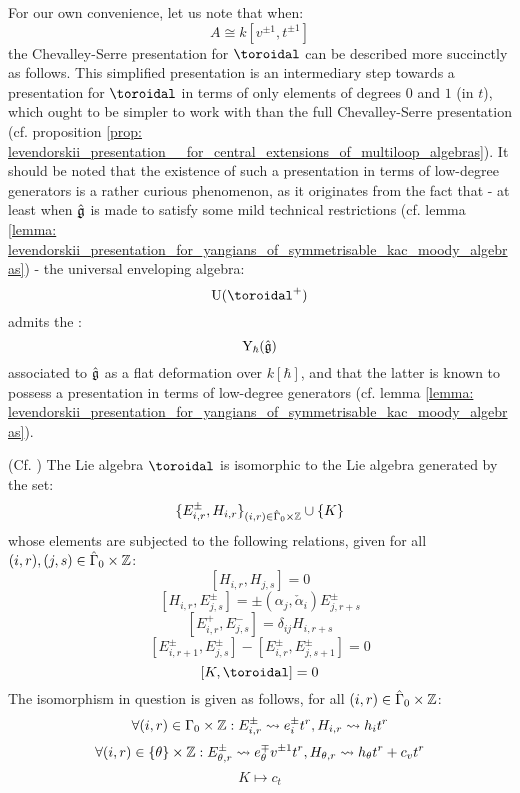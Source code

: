         For our own convenience, let us note that when:
            $$A \cong k[v^{\pm 1}, t^{\pm 1}]$$
        the Chevalley-Serre presentation for $\toroidal$ can be described more succinctly as follows. This simplified presentation is an intermediary step towards a presentation for $\toroidal$ in terms of only elements of degrees $0$ and $1$ (in $t$), which ought to be simpler to work with than the full Chevalley-Serre presentation (cf. proposition \ref{prop: levendorskii_presentation__for_central_extensions_of_multiloop_algebras}). It should be noted that the existence of such a presentation in terms of low-degree generators is a rather curious phenomenon, as it originates from the fact that - at least when $\hat{\mathfrak{g}}$ is made to satisfy some mild technical restrictions (cf. lemma \ref{lemma: levendorskii_presentation_for_yangians_of_symmetrisable_kac_moody_algebras}) - the universal enveloping algebra:
            $$\rmU(\toroidal^+)$$
        admits the :
            $$\mathrm{Y}_{\hbar}(\hat{\mathfrak{g}})$$
        associated to $\hat{\mathfrak{g}}$ as a  flat deformation over $k[\hbar]$, and that the latter is known to possess a presentation in terms of low-degree generators (cf. lemma \ref{lemma: levendorskii_presentation_for_yangians_of_symmetrisable_kac_moody_algebras}).
        \begin{lemma} \label{lemma: chevalley_serre_presentation_for_central_extensions_of_multiloop_algebras}
            (Cf. \cite[Proposition 6.6]{wendlandt_formal_shift_operators_on_yangian_doubles}) The Lie algebra $\toroidal$ is isomorphic to the Lie algebra generated by the set:
                $$\{ E_{i, r}^{\pm}, H_{i, r} \}_{(i, r) \in \hat{\Gamma}_0 \x \Z} \cup \{ K \}$$
            whose elements are subjected to the following relations, given for all $(i, r), (j, s) \in \hat{\Gamma}_0 \x \Z$:
                $$[ H_{i, r}, H_{j, s} ] = 0$$
                $$[ H_{i, r}, E_{j, s}^{\pm} ] = \pm (\alpha_j, \check{\alpha}_i) E_{j, r + s}^{\pm}$$
                $$[ E_{i, r}^+, E_{j, s}^- ] = \delta_{ij} H_{i, r + s}$$
                $$[ E_{i, r + 1}^{\pm}, E_{j, s}^{\pm} ] - [ E_{i, r}^{\pm}, E_{j, s + 1}^{\pm} ] = 0$$
                $$[K, \toroidal] = 0$$
            The isomorphism in question is given as follows, for all $(i, r) \in \hat{\Gamma}_0 \x \Z$:
                $$\forall (i, r) \in \Gamma_0 \x \Z: E_{i, r}^{\pm} \mapsto e_i^{\pm} t^r, H_{i, r} \mapsto h_i t^r$$
                $$\forall (i, r) \in \{\theta\} \x \Z: E_{\theta, r}^{\pm} \mapsto e_{\theta}^{\mp} v^{\pm 1} t^r, H_{\theta, r} \mapsto h_{\theta} t^r + c_v t^r$$
                $$K \mapsto c_t$$
        \end{lemma}

